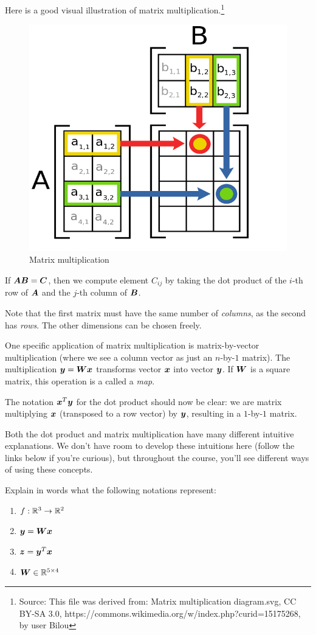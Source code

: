 \documentclass[11pt]{article}
\begin{document}
Here is a good visual illustration of matrix multiplication.\footnote{Source: This file was derived from:  Matrix multiplication diagram.svg, CC BY-SA 3.0, https://commons.wikimedia.org/w/index.php?curid=15175268, by user Bilou}
\begin{figure}[H]
\centering
\includegraphics[width=0.7\linewidth]{matmul}
\caption{Matrix multiplication}
\end{figure}
If ${\bm A}{\bm B} = {\bm C}$, then we compute element $C_{ij}$ by taking the dot product of the $i$-th row of ${\bm A}$ and the $j$-th column of ${\bm B}$.

\noindent Note that the first matrix must have the same number of \emph{columns}, as the second has \emph{rows}. The other dimensions can be chosen freely.

One specific application of matrix multiplication is matrix-by-vector multiplication (where we see a column vector as just an $n$-by-$1$ matrix). The multiplication ${\bm y} = {\bm W}{\bm x}$ transforms vector ${\bm x}$ into vector ${\bm y}$. If ${\bm W}$ is a square matrix, this operation is a called a \emph{map}.

The notation ${\bm x}^T{\bm y}$ for the dot product should now be clear: we are matrix multiplying ${\bm x}$ (transposed to a row vector) by ${\bm y}$, resulting in a $1$-by-$1$ matrix.

Both the dot product and matrix multiplication have many different intuitive explanations. We don't have room to develop these intuitions here (follow the links below if you're curious), but throughout the course, you'll see different ways of using these concepts.

\qu Explain in words what the following notations represent:

\begin{enumerate}
\item $f: {\mathbb R}^3 \to {\mathbb R}^2$ 
\item ${\bm y} = {\bm W} {\bm x}$ 
\item ${\bm z} = {\bm y}^T{\bm x}$ 
\item ${\bm W} \in {\mathbb R}^{5 \times 4}$ 
\end{enumerate}
\end{document}
